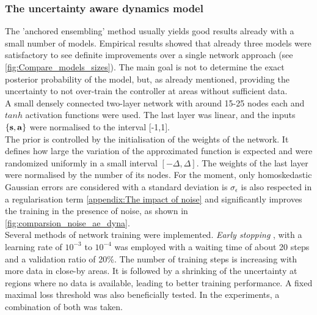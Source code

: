 \documentclass[
reprint,
amsmath,amssymb,amsfonts,clevref,
aps,
prstab,
]{revtex4-2}
\begin{document}
\subsubsection{The uncertainty aware dynamics model}\label{ss:The uncertainty aware dynamics model}
The 'anchored ensembling' method usually yields good results already with a small number of models. Empirical results showed that already three models were satisfactory to see definite improvements over a single network approach (see \cref{fig:Compare_models_sizes}). The main goal is not to determine the exact posterior probability of the model, but, as already mentioned, providing the uncertainty to not over-train the controller at areas without sufficient data.\\
A small densely connected two-layer network with around 15-25 nodes each and $tanh$ activation functions were used. The last layer was linear, and the inputs $\{\mathbf{s},\mathbf{a}\}$ were normalised to the interval [-1,1].\\
The prior is controlled by the initialisation of the weights of the network. It defines how large the variation of the approximated function is expected and were randomized uniformly in a small interval $[-\Delta, \Delta]$. The weights of the last layer were normalised by the number of its nodes. For the moment, only homoskedastic Gaussian errors are considered with a standard deviation is $\sigma_\epsilon$ is also respected in a regularisation term \cref{appendix:The impact of noise} and significantly improves the training in the presence of noise, as shown in \cref{fig:comparsion_noise_ae_dyna}. \\
Several methods of network training were implemented. \emph{Early stopping} \cite{Goodfellow2016}, with a learning rate of $10^{-3}$ to $10^{-4}$  was employed  with a waiting time of about 20 steps and a validation ratio of 20\%. The number of training steps is increasing with more data in close-by areas. It is followed by a shrinking of the uncertainty at regions where no data is available, leading to better training performance. A fixed maximal loss threshold was also beneficially tested. In the experiments, a combination of both was taken.
\end{document}
